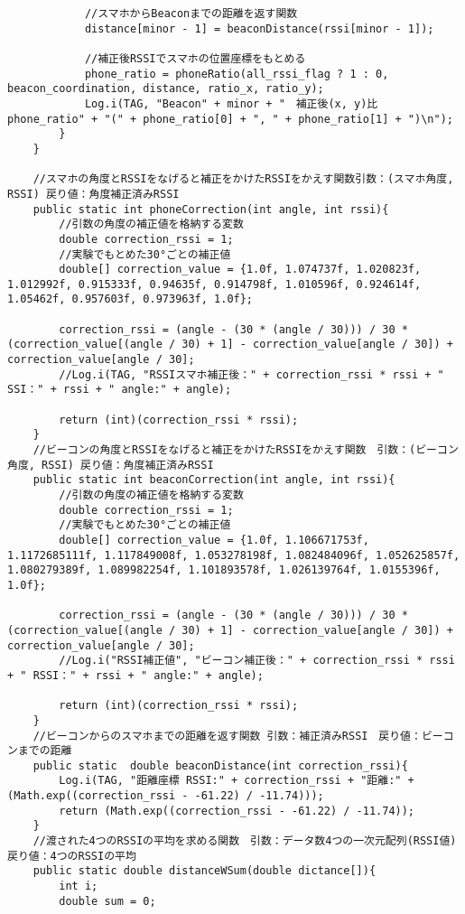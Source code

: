 \documentclass[11pt,a4j]{jarticle}
\begin{document}
\begin{verbatim}
            //スマホからBeaconまでの距離を返す関数
            distance[minor - 1] = beaconDistance(rssi[minor - 1]);

            //補正後RSSIでスマホの位置座標をもとめる
            phone_ratio = phoneRatio(all_rssi_flag ? 1 : 0, beacon_coordination, distance, ratio_x, ratio_y);
            Log.i(TAG, "Beacon" + minor + "　補正後(x, y)比　phone_ratio" + "(" + phone_ratio[0] + ", " + phone_ratio[1] + ")\n");
        }
    }

    //スマホの角度とRSSIをなげると補正をかけたRSSIをかえす関数引数：(スマホ角度, RSSI) 戻り値：角度補正済みRSSI
    public static int phoneCorrection(int angle, int rssi){
        //引数の角度の補正値を格納する変数
        double correction_rssi = 1;
        //実験でもとめた30°ごとの補正値
        double[] correction_value = {1.0f, 1.074737f, 1.020823f, 1.012992f, 0.915333f, 0.94635f, 0.914798f, 1.010596f, 0.924614f, 1.05462f, 0.957603f, 0.973963f, 1.0f};

        correction_rssi = (angle - (30 * (angle / 30))) / 30 * (correction_value[(angle / 30) + 1] - correction_value[angle / 30]) + correction_value[angle / 30];
        //Log.i(TAG, "RSSIスマホ補正後：" + correction_rssi * rssi + " SSI：" + rssi + " angle:" + angle);

        return (int)(correction_rssi * rssi);
    }
    //ビーコンの角度とRSSIをなげると補正をかけたRSSIをかえす関数　引数：(ビーコン角度, RSSI) 戻り値：角度補正済みRSSI
    public static int beaconCorrection(int angle, int rssi){
        //引数の角度の補正値を格納する変数
        double correction_rssi = 1;
        //実験でもとめた30°ごとの補正値
        double[] correction_value = {1.0f, 1.106671753f, 1.1172685111f, 1.117849008f, 1.053278198f, 1.082484096f, 1.052625857f, 1.080279389f, 1.089982254f, 1.101893578f, 1.026139764f, 1.0155396f, 1.0f};

        correction_rssi = (angle - (30 * (angle / 30))) / 30 * (correction_value[(angle / 30) + 1] - correction_value[angle / 30]) + correction_value[angle / 30];
        //Log.i("RSSI補正値", "ビーコン補正後：" + correction_rssi * rssi + " RSSI：" + rssi + " angle:" + angle);

        return (int)(correction_rssi * rssi);
    }
    //ビーコンからのスマホまでの距離を返す関数 引数：補正済みRSSI　戻り値：ビーコンまでの距離
    public static  double beaconDistance(int correction_rssi){
        Log.i(TAG, "距離座標 RSSI:" + correction_rssi + "距離:" + (Math.exp((correction_rssi - -61.22) / -11.74)));
        return (Math.exp((correction_rssi - -61.22) / -11.74));
    }
    //渡された4つのRSSIの平均を求める関数　引数：データ数4つの一次元配列(RSSI値)　戻り値：4つのRSSIの平均
    public static double distanceWSum(double dictance[]){
        int i;
        double sum = 0;


\end{verbatim}
\end{document}
